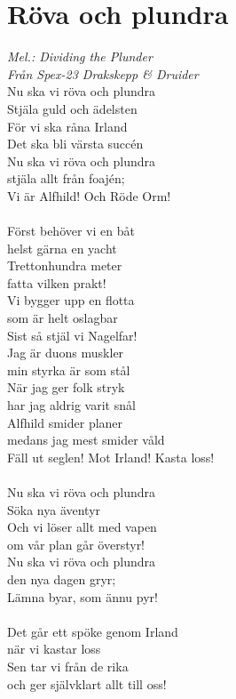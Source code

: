 \documentclass[a5paper,15pt]{article}
\begin{document}
\section{Röva och plundra}
\emph{Mel.: Dividing the Plunder\\
Från Spex-23 Drakskepp \& Druider}
\\
\small Nu ska vi röva och plundra\\
Stjäla guld och ädelsten\\
För vi ska råna Irland\\
Det ska bli värsta succén\\
Nu ska vi röva och plundra\\
stjäla allt från foajén;\\
Vi är Alfhild! Och Röde Orm!\\
\\
Först behöver vi en båt\\
helst gärna en yacht\\
Trettonhundra meter\\
fatta vilken prakt!\\
Vi bygger upp en flotta\\
som är helt oslagbar\\
Sist så stjäl vi Nagelfar!\\
Jag är duons muskler\\
min styrka är som stål\\
När jag ger folk stryk\\
har jag aldrig varit snål\\
Alfhild smider planer\\
medans jag mest smider våld\\
Fäll ut seglen! Mot Irland! Kasta loss!\\
\\
Nu ska vi röva och plundra\\
Söka nya äventyr\\
Och vi löser allt med vapen \\
om vår plan går överstyr!\\
Nu ska vi röva och plundra\\
den nya dagen gryr;\\
Lämna byar, som ännu pyr!\\
\\
Det går ett spöke genom Irland \\
när vi kastar loss\\
Sen tar vi från de rika\\
och ger självklart allt till oss!\\
\end{document}
